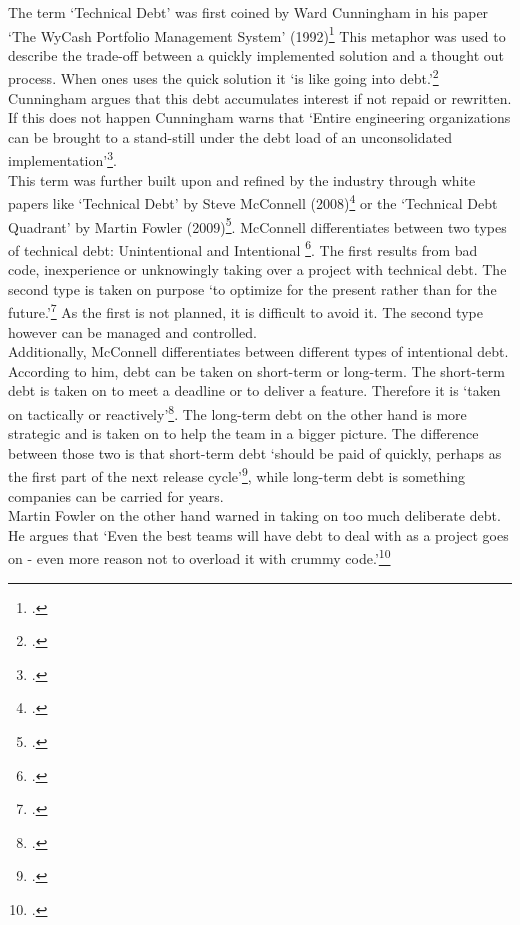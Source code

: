 The term `Technical Debt' was first coined by Ward Cunningham in his paper `The WyCash Portfolio Management System' (1992)\footcite{cunninghamWyCashPortfolioManagement1992} This metaphor was used to describe the trade-off between a quickly implemented solution and a thought out process. 
When ones uses the quick solution it `is like going into debt.'\footcite[2]{cunninghamWyCashPortfolioManagement1992} Cunningham argues that this debt accumulates interest if not repaid or rewritten. 
If this does not happen Cunningham warns that `Entire engineering organizations can be brought to a stand-still under the debt load of an unconsolidated implementation'\footcite[2]{cunninghamWyCashPortfolioManagement1992}.\\

This term was further built upon and refined by the industry through white papers like `Technical Debt' by Steve McConnell (2008)\footcite{mcconnellManagingTechnicalDebt2017} or the `Technical Debt Quadrant' by Martin Fowler (2009)\footcite{fowlerTechnicalDebtQuadrant2009}.
McConnell differentiates between two types of technical debt: Unintentional and Intentional \footcite[3]{mcconnellManagingTechnicalDebt2017}. The first results from bad code, inexperience or unknowingly taking over a project with technical debt.
The second type is taken on purpose `to optimize for the present rather than for the future.'\footcite[3]{mcconnellManagingTechnicalDebt2017} As the first is not planned, it is difficult to avoid it. The second type however can be managed and controlled.\\
Additionally, McConnell differentiates between different types of intentional debt. According to him, debt can be taken on short-term or long-term. The short-term debt is taken on to meet a deadline or to deliver a feature. Therefore it is `taken on tactically or reactively'\footcite[3]{mcconnellManagingTechnicalDebt2017}.
The long-term debt on the other hand is more strategic and is taken on to help the team in a bigger picture. The difference between those two is that short-term debt `should be paid of quickly, perhaps as the first part of the next release cycle'\footcite[4]{mcconnellManagingTechnicalDebt2017}, while 
long-term debt is something companies can be carried for years.\\
Martin Fowler on the other hand warned in taking on too much deliberate debt. He argues that `Even the best teams will have debt to deal with as a project goes on - even more reason not to overload it with crummy code.'\footcite{fowlerTechnicalDebtQuadrant2009}
